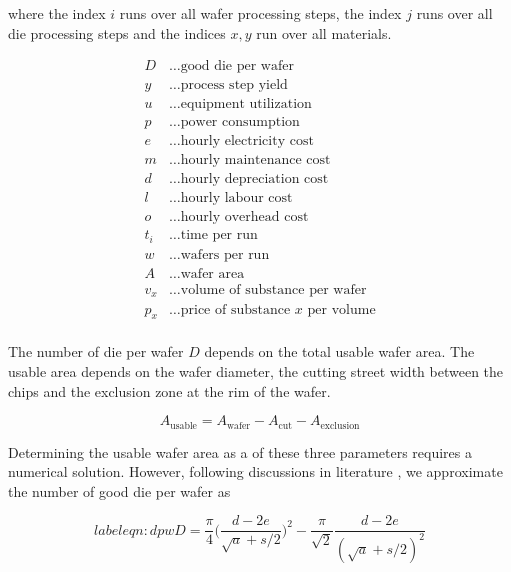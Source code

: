 \documentclass{article}
\begin{document}
where the index $i$ runs over all wafer processing steps, the index $j$ runs over all die processing steps and the indices $x,y$ run over all materials.

\begin{align*}
        D &\dots \text{good die per wafer} \label{def:cost_wafer_first} \\
        y &\dots \text{process step yield} \\
        u &\dots \text{equipment utilization} \\
        p &\dots \text{power consumption} \\
        e &\dots \text{hourly electricity cost} \\
        m &\dots \text{hourly maintenance cost} \\
        d &\dots \text{hourly depreciation cost}\\
        l &\dots \text{hourly labour cost} \\
        o &\dots \text{hourly overhead cost} \\
        t_i &\dots \text{time per run} \\
        w &\dots \text{wafers per run} \\
        A &\dots \text{wafer area} \\
        v_x &\dots \text{volume of substance per wafer} \\
        p_x &\dots \text{price of substance $x$ per volume}\\
\end{align*}

The number of die per wafer $D$ depends on the total usable wafer area. The usable area depends on the wafer diameter, the cutting street width between the chips and the exclusion zone at the rim of the wafer.

\begin{equation}
	A_{\text{usable}}=A_{\text{wafer}}-A_{\text{cut}}-A_{\text{exclusion}}
\end{equation}

Determining the usable wafer area as a of these three parameters requires a numerical solution. However, following discussions in literature \cite{de2005investigation}, we approximate the number of good die per wafer as

\begin{equation}
label{eqn:dpw}
	D=\frac{\pi}{4}  \bigg ( \frac{d-2e}{\sqrt{a}+s/2} \bigg ) ^2 - \frac{\pi}{\sqrt{2}}\frac{d-2e}{(\sqrt{a}+s/2)^2}
\end{equation}
\end{document}
